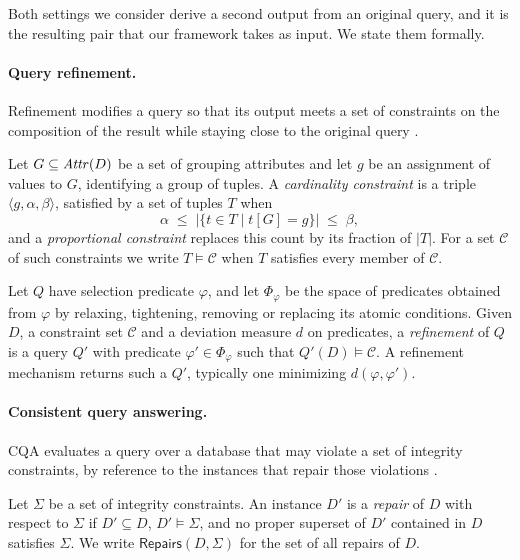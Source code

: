Both settings we consider derive a second output from an original query, and it is
the resulting pair that our framework takes as input. We state them formally.

\paragraph{Query refinement.}
Refinement modifies a query so that its output meets a set of constraints on the
composition of the result while staying close to the original query
\cite{MK09,LMSJ23,ERICA,CSSM24}.

\begin{definition}
\label{def:output-constraint}
Let $G\subseteq\mathit{Attr}(D)$ be a set of grouping attributes and let $g$ be an
assignment of values to $G$, identifying a group of tuples. A \emph{cardinality
constraint} is a triple $\langle g,\alpha,\beta\rangle$, satisfied by a set of
tuples $T$ when
\[
\alpha \;\le\; |\{t\in T \mid t[G]=g\}| \;\le\; \beta ,
\]
and a \emph{proportional constraint} replaces this count by its fraction of $|T|$.
For a set $\mathcal{C}$ of such constraints we write $T\models\mathcal{C}$ when $T$
satisfies every member of $\mathcal{C}$.
\end{definition}

\begin{definition}
\label{def:refinement}
Let $Q$ have selection predicate $\varphi$, and let $\Phi_\varphi$ be the space of
predicates obtained from $\varphi$ by relaxing, tightening, removing or replacing
its atomic conditions. Given $D$, a constraint set $\mathcal{C}$ and a deviation
measure $d$ on predicates, a \emph{refinement} of $Q$ is a query $Q'$ with
predicate $\varphi'\in\Phi_\varphi$ such that $Q'(D)\models\mathcal{C}$. A
refinement mechanism returns such a $Q'$, typically one minimizing
$d(\varphi,\varphi')$.
\end{definition}

\paragraph{Consistent query answering.}
CQA evaluates a query over a database that may violate a set of integrity
constraints, by reference to the instances that repair those violations
\cite{arenas1999,bertossi2006,bertossi2011}.

\begin{definition}[Repair]
\label{def:repair}
Let $\Sigma$ be a set of integrity constraints. An instance $D'$ is a
\emph{repair} of $D$ with respect to $\Sigma$ if $D'\subseteq D$,
$D'\models\Sigma$, and no proper superset of $D'$ contained in $D$ satisfies
$\Sigma$. We write $\mathsf{Repairs}(D,\Sigma)$ for the set of all repairs of $D$.
\end{definition}

